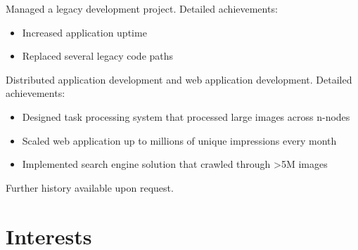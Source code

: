 \documentclass[11pt,a4paper,sans]{moderncv}   %
\begin{document}
{Managed a legacy development project.\newline{}%
Detailed achievements:%
\begin{itemize}%
\item Increased application uptime
\item Replaced several legacy code paths
\end{itemize}}
{Distributed application development and web application development.\newline{}%
Detailed achievements:%
\begin{itemize}%
\item Designed task processing system that processed large images across
  n-nodes
\item Scaled web application up to millions of unique impressions
  every month
\item Implemented search engine solution that crawled through >5M
  images
\end{itemize}}
{Further history available upon request.}

\section{Interests}



\nocite{*}

\end{document}
